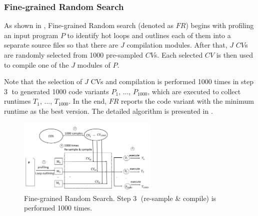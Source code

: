 \subsubsection{Fine-grained Random Search}

As shown in , Fine-grained Random search (denoted as
$FR$) begins with profiling an input program $P$ to identify hot loops
and outlines each of them into a separate source files so that there
are $J$ compilation modules.  After that, $J$ $CV$s are randomly
selected from 1000 pre-sampled $CV$s.  Each selected $CV$ is then used
to compile one of the $J$ modules of $P$.

Note that the selection of $J$ CVs and compilation is performed 1000
times in step \textcircled{3} to generated 1000 code variants $P_1$,
..., $P_{1000}$, which are executed to collect runtimes $T_1$, ...,
$T_{1000}$.  In the end, $FR$ reports the code variant with the
minimum runtime as the best version.  
The detailed algorithm is
presented in .

\begin{figure}
\centering
\includegraphics[width=0.6\textwidth]{figures/fr}
\caption{Fine-grained Random Search. Step \textcircled{3} (re-sample \& compile) is performed 1000 times.}
\label{fig:fr}
\end{figure}

